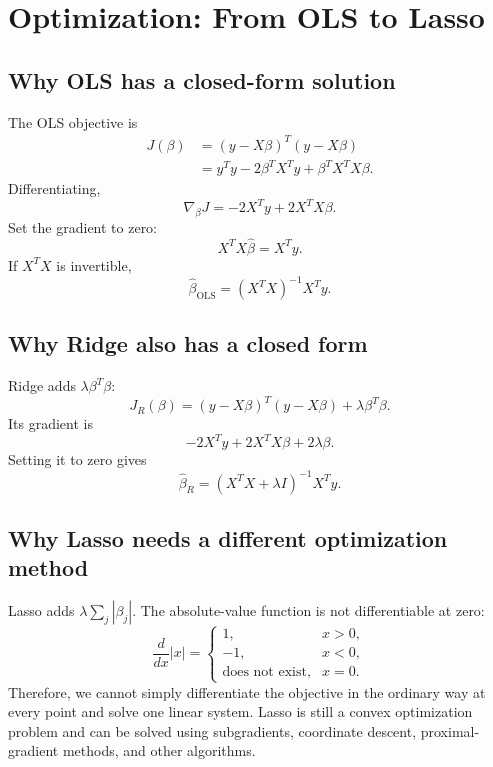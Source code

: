 \documentclass[11pt,a4paper,oneside]{book}
\newcommand{\abs}[1]{\left|#1\right|}
\begin{document}
\chapter{Optimization: From OLS to Lasso}
\section{Why OLS has a closed-form solution}
The OLS objective is
\begin{align}
  J(\beta)&=(y-X\beta)^T(y-X\beta)\\
  &=y^Ty-2\beta^TX^Ty+\beta^TX^TX\beta.
\end{align}
Differentiating,
\begin{equation}
  \nabla_\beta J=-2X^Ty+2X^TX\beta.
\end{equation}
Set the gradient to zero:
\begin{equation}
  X^TX\hat\beta=X^Ty.
\end{equation}
If $X^TX$ is invertible,
\begin{equation}
  \boxed{\hat\beta_{\mathrm{OLS}}=(X^TX)^{-1}X^Ty.}
\end{equation}

\section{Why Ridge also has a closed form}
Ridge adds $\lambda\beta^T\beta$:
\begin{equation}
  J_R(\beta)=(y-X\beta)^T(y-X\beta)+\lambda\beta^T\beta.
\end{equation}
Its gradient is
\begin{equation}
  -2X^Ty+2X^TX\beta+2\lambda\beta.
\end{equation}
Setting it to zero gives
\begin{equation}
  \boxed{\hat\beta_R=(X^TX+\lambda I)^{-1}X^Ty.}
\end{equation}

\section{Why Lasso needs a different optimization method}
Lasso adds $\lambda\sum_j\abs{\beta_j}$. The absolute-value function is not differentiable at zero:
\begin{equation}
  \frac{d}{dx}\abs{x}=\begin{cases}
  1,&x>0,\\-1,&x<0,\\\text{does not exist},&x=0.
  \end{cases}
\end{equation}
Therefore, we cannot simply differentiate the objective in the ordinary way at every point and solve one linear system. Lasso is still a convex optimization problem and can be solved using subgradients, coordinate descent, proximal-gradient methods, and other algorithms.
\end{document}
